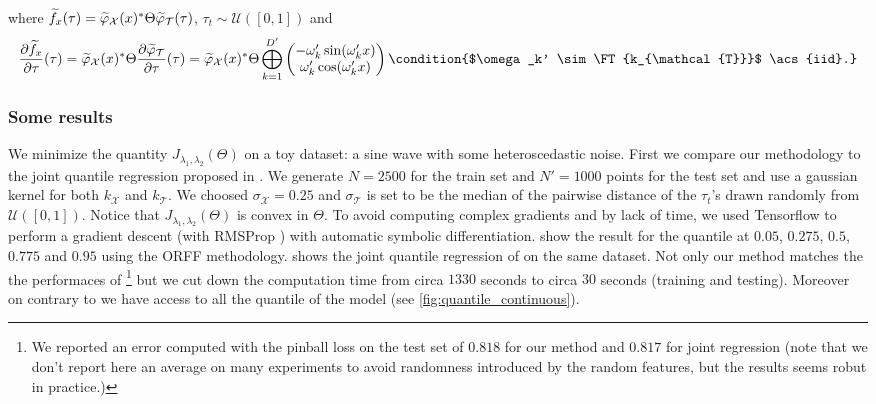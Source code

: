 where $\widetilde{f}_{x}(\tau)=\widetilde{\varphi}_{\mathcal{X}}(x)^*
\Theta \widetilde{\varphi}_{\mathcal{T}}(\tau)$, $\tau_t \sim \mathcal{U}([0,
1])$ and
\begin{dmath*}
    \frac{\partial \widetilde{f}_{x}}{\partial\tau}(\tau)
    = \tildephi{\omega}_{\mathcal{X}}(x)^\adjoint \Theta \frac{\partial
    \tildephi{\omega}_{\mathcal{T}}}{\partial \tau}(\tau)
    = \tildephi{\omega}_{\mathcal{X}}(x)^\adjoint \Theta \Vect_{k=1}^{D'}
    \begin{pmatrix}
        -\omega_k' \sin(\omega_k' x) \\
         \omega_k' \cos(\omega_k' x)
    \end{pmatrix} \condition{$\omega_k' \sim \FT{k_{\mathcal{T}}}$ \acs{iid}.}
\end{dmath*}
\subsubsection{Some results}
We minimize the quantity $J_{\lambda_1, \lambda_2}(\Theta)$ on a toy dataset: a
sine wave with some heteroscedastic noise. First we compare our methodology to
the joint quantile regression proposed in \citet{sangnier2016joint}. We
generate $N=2500$ for the train set and $N'=1000$ points for the test set and
use a gaussian kernel for both $k_{\mathcal{X}}$ and $k_{\mathcal{T}}$. We
choosed $\sigma_{\mathcal{X}} = 0.25$ and $\sigma_{\mathcal{T}}$ is set to be
the median of the pairwise distance of the $\tau_t$'s drawn randomly from
$\mathcal{U}([0, 1])$. Notice that $J_{\lambda_1, \lambda_2}(\Theta)$ is convex
in $\Theta$. To avoid computing complex gradients and by lack of time, we used
Tensorflow \citep{abadi2016tensorflow} to perform a gradient descent (with
RMSProp \citep{tieleman2012lecture}) with automatic symbolic differentiation.
 show the result for the quantile at $0.05$, $0.275$,
$0.5$, $0.775$ and $0.95$ using the \acs{ORFF} methodology. 
 shows the joint quantile regression of
\citet{sangnier2016joint} on the same dataset. Not only our method matches the
the performaces of \citet{sangnier2016joint}\footnote{We reported an error
computed with the pinball loss on the test set of $0.818$ for our method and
$0.817$ for joint regression (note that we don't report here an average on many
experiments to avoid randomness introduced by the random features, but the
results seems robut in practice.)} but we cut down the computation time from
circa $1330$ seconds to circa $30$ seconds (training and testing).  Moreover on
contrary to \citet{sangnier2016joint} we have access to all the quantile of the
model (see \cref{fig:quantile_continuous}).

